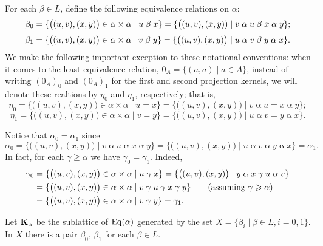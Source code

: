 \noindent For each $\beta \in L$, define the following equivalence relations on $\alpha$:
\[
\beta_0 = \{\bigl((u, v), (x, y)\bigr) \in \alpha\times \alpha \mid u \mathrel{\beta} x\}
= \{\bigl((u, v), (x, y)) \mid v\mathrel{\alpha} u \mathrel{\beta} x \mathrel{\alpha} y\};
\]
\[
\beta_1 = \{\bigl((u, v), (x, y)\bigr) \in \alpha\times \alpha \mid v \mathrel{\beta} y\}
= \{\bigl((u, v), (x, y)\bigr) \mid u\mathrel{\alpha} v \mathrel{\beta} y \mathrel{\alpha} x\}.
\]
We make the following important exception to these notational conventions:
when it comes to the least equivalence relation, $0_A = \{(a,a)\mid a\in A\}$,
instead of writing $(0_A)_0$ and $(0_A)_1$ for the first and second projection kernels,
we will denote these realtions by $\eta_0$ and $\eta_1$, respectively; that is, 
\[
\eta_0 = \{ \bigl((u, v), (x, y)\bigr) \in \alpha \times \alpha \mid u = x\} = 
\{ \bigl((u,v), (x,y)\bigr) \mid v \mathrel{\alpha} u = x \mathrel{\alpha} y\};
\]
\[
\eta_1 = \{ \bigl((u, v), (x, y)\bigr) \in \alpha \times \alpha \mid v = y\} = 
\{ \bigl((u, v), (x, y)\bigr) \mid u \mathrel{\alpha} v = y \mathrel{\alpha} x\}.
\]

Notice that $\alpha_0 = \alpha_1$ since
\[
\alpha_0  
= \{\bigl((u,v), (x,y)\bigr) \mid v \mathrel{\alpha} u \mathrel{\alpha} x \mathrel{\alpha} y\}
 = \{\bigl((u,v), (x,y)\bigr) \mid u \mathrel{\alpha} v \mathrel{\alpha} y \mathrel{\alpha} x\} = \alpha_1.
\]
In fact, for each $\gamma \geq \alpha$ we have  $\gamma_0 = \gamma_1$. Indeed,
\begin{align*}
\gamma_0 &= \{\bigl((u,v), (x,y)\bigr) \in \alpha\times \alpha \mid u \mathrel{\gamma} x\}
= \{\bigl((u,v), (x,y)\bigr) \mid y \mathrel{\alpha} x \mathrel{\gamma} u \mathrel{\alpha} v\}\\
&= \{\bigl((u,v), (x,y)\bigr) \in \alpha \times \alpha \mid v \mathrel{\gamma} u \mathrel{\gamma} x \mathrel{\gamma} y\} 
\qquad \text{(assuming $\gamma \geqslant \alpha$)}\\
& = \{\bigl((u,v),(x,y)\bigr) \in \alpha\times \alpha \mid v \mathrel{\gamma} y \} = \gamma_1.
\end{align*}

\medskip

\noindent Let $\mathbf{K}_\alpha$ be the sublattice of $\operatorname{Eq}(\alpha)$ generated by the set 
$X = \{\beta_i \mid \beta \in L, i = 0, 1\}$.
In $X$ there is a pair $\beta_0$, $\beta_1$ for each $\beta \in L$.

